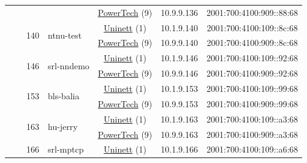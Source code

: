 \begin{small}
\begin{center}
\begin{longtable}{|c|c|c|c|c|c|c|c|}
  &  &  &  & \multicolumn{2}{|c|}{\tiny{\href{http://www.powertech.no}{PowerTech} (9)}} & \tiny{10.9.9.136} & \tiny{2001:700:4100:909::88:68} \\* \cline{3-3}\cline{4-4}\cline{5-5}\cline{6-6}\cline{7-7}\cline{8-8}
  &  & \multirow{2}{*}{\tiny{140}} & \multicolumn{1}{|l|}{\multirow{2}{*}{\tiny{ntnu-test}}} & \multicolumn{2}{|c|}{\tiny{\href{https://www.uninett.no}{Uninett} (1)}} & \tiny{10.1.9.140} & \tiny{2001:700:4100:109::8c:68} \\* \cline{5-5}\cline{6-6}\cline{7-7}\cline{8-8}
  &  &  &  & \multicolumn{2}{|c|}{\tiny{\href{http://www.powertech.no}{PowerTech} (9)}} & \tiny{10.9.9.140} & \tiny{2001:700:4100:909::8c:68} \\* \cline{3-3}\cline{4-4}\cline{5-5}\cline{6-6}\cline{7-7}\cline{8-8}
  &  & \multirow{2}{*}{\tiny{146}} & \multicolumn{1}{|l|}{\multirow{2}{*}{\tiny{srl-nndemo}}} & \multicolumn{2}{|c|}{\tiny{\href{https://www.uninett.no}{Uninett} (1)}} & \tiny{10.1.9.146} & \tiny{2001:700:4100:109::92:68} \\* \cline{5-5}\cline{6-6}\cline{7-7}\cline{8-8}
  &  &  &  & \multicolumn{2}{|c|}{\tiny{\href{http://www.powertech.no}{PowerTech} (9)}} & \tiny{10.9.9.146} & \tiny{2001:700:4100:909::92:68} \\* \cline{3-3}\cline{4-4}\cline{5-5}\cline{6-6}\cline{7-7}\cline{8-8}
  &  & \multirow{2}{*}{\tiny{153}} & \multicolumn{1}{|l|}{\multirow{2}{*}{\tiny{bls-balia}}} & \multicolumn{2}{|c|}{\tiny{\href{https://www.uninett.no}{Uninett} (1)}} & \tiny{10.1.9.153} & \tiny{2001:700:4100:109::99:68} \\* \cline{5-5}\cline{6-6}\cline{7-7}\cline{8-8}
  &  &  &  & \multicolumn{2}{|c|}{\tiny{\href{http://www.powertech.no}{PowerTech} (9)}} & \tiny{10.9.9.153} & \tiny{2001:700:4100:909::99:68} \\* \cline{3-3}\cline{4-4}\cline{5-5}\cline{6-6}\cline{7-7}\cline{8-8}
  &  & \multirow{2}{*}{\tiny{163}} & \multicolumn{1}{|l|}{\multirow{2}{*}{\tiny{hu-jerry}}} & \multicolumn{2}{|c|}{\tiny{\href{https://www.uninett.no}{Uninett} (1)}} & \tiny{10.1.9.163} & \tiny{2001:700:4100:109::a3:68} \\* \cline{5-5}\cline{6-6}\cline{7-7}\cline{8-8}
  &  &  &  & \multicolumn{2}{|c|}{\tiny{\href{http://www.powertech.no}{PowerTech} (9)}} & \tiny{10.9.9.163} & \tiny{2001:700:4100:909::a3:68} \\* \cline{3-3}\cline{4-4}\cline{5-5}\cline{6-6}\cline{7-7}\cline{8-8}
  &  & \multirow{2}{*}{\tiny{166}} & \multicolumn{1}{|l|}{\multirow{2}{*}{\tiny{srl-mptcp}}} & \multicolumn{2}{|c|}{\tiny{\href{https://www.uninett.no}{Uninett} (1)}} & \tiny{10.1.9.166} & \tiny{2001:700:4100:109::a6:68} \\* \cline{5-5}\cline{6-6}\cline{7-7}\cline{8-8}

\end{longtable}
\end{center}
\end{small}
